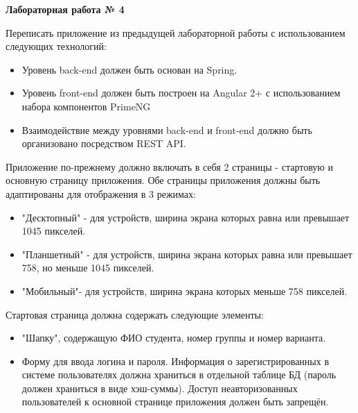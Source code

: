 \newpage

\begin{center}
	\textbf{Лабораторная работа № 4}
\end{center}

Переписать приложение из предыдущей лабораторной работы с использованием следующих технологий:
\begin{itemize}
\item Уровень back-end должен быть основан на Spring.
\item Уровень front-end должен быть построен на Angular 2+ с использованием набора компонентов PrimeNG
\item Взаимодействие между уровнями back-end и front-end должно быть организовано посредством REST API.
\end{itemize}

Приложение по-прежнему должно включать в себя 2 страницы - стартовую и основную страницу приложения. Обе страницы приложения должны быть адаптированы для отображения в 3 режимах:
\begin{itemize}
\item "Десктопный" - для устройств, ширина экрана которых равна или превышает 1045 пикселей.
\item "Планшетный" - для устройств, ширина экрана которых равна или превышает 758, но меньше 1045 пикселей.
\item "Мобильный"- для устройств, ширина экрана которых меньше 758 пикселей.
\end{itemize}

Стартовая страница должна содержать следующие элементы:
\begin{itemize}
\item "Шапку", содержащую ФИО студента, номер группы и номер варианта.
\item Форму для ввода логина и пароля. Информация о зарегистрированных в системе пользователях должна храниться в отдельной таблице БД (пароль должен храниться в виде хэш-суммы). Доступ неавторизованных пользователей к основной странице приложения должен быть запрещён.
\end{itemize}

